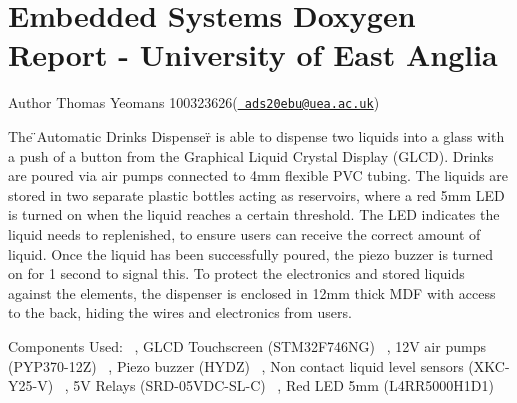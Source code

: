 \chapter{Embedded Systems Doxygen Report -\/ University of East Anglia}
\hypertarget{index}{}\label{index}
\begin{DoxyAuthor}{Author}
Thomas Yeomans 100323626(\href{mailto:ads20ebu@uea.ac.uk}{\texttt{ ads20ebu@uea.\+ac.\+uk}})
\end{DoxyAuthor}
The \"{}\+Automatic Drinks Dispenser\"{} is able to dispense two liquids into a glass with a push of a button from the Graphical Liquid Crystal Display (GLCD). Drinks are poured via air pumps connected to 4mm flexible PVC tubing. The liquids are stored in two separate plastic bottles acting as reservoirs, where a red 5mm LED is turned on when the liquid reaches a certain threshold. The LED indicates the liquid needs to replenished, to ensure users can receive the correct amount of liquid. Once the liquid has been successfully poured, the piezo buzzer is turned on for 1 second to signal this. To protect the electronics and stored liquids against the elements, the dispenser is enclosed in 12mm thick MDF with access to the back, hiding the wires and electronics from users.

Components Used\+: ~, GLCD Touchscreen (STM32\+F746\+NG) ~, 12V air pumps (PYP370-\/12Z) ~, Piezo buzzer (HYDZ) ~, Non contact liquid level sensors (XKC-\/\+Y25-\/V) ~, 5V Relays (SRD-\/05\+VDC-\/\+SL-\/C) ~, Red LED 5mm (L4\+RR5000\+H1\+D1) ~\newline
 